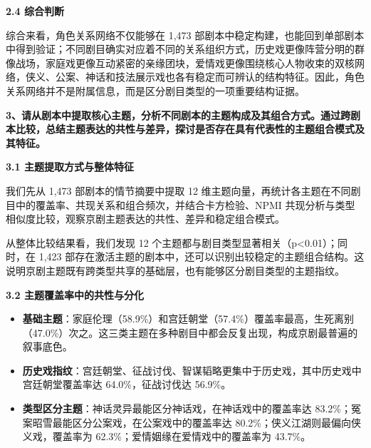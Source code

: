 \documentclass[12pt, a4paper]{article}
\begin{document}
{\fontsize{13bp}{18bp}\heiti\bfseries 2.4 综合判断}

\vspace{4pt}

{\fontsize{12bp}{20bp}\kaishu
综合来看，角色关系网络不仅能够在 1{,}473 部剧本中稳定构建，也能回到单部剧本中得到验证；不同剧目确实对应着不同的关系组织方式，历史戏更像阵营分明的群像战场，家庭戏更像互动紧密的亲缘团块，爱情戏更像围绕核心人物收束的双核网络，侠义、公案、神话和技法展示戏也各有稳定而可辨认的结构特征。因此，角色关系网络并不是附属信息，而是区分剧目类型的一项重要结构证据。
}

\vspace{10pt}

\newpage


{\fontsize{13bp}{20bp}\heiti\bfseries
3、请从剧本中提取核心主题，分析不同剧本的主题构成及其组合方式。通过跨剧本比较，总结主题表达的共性与差异，探讨是否存在具有代表性的主题组合模式及其特征。
}

\vspace{6pt}

{\fontsize{13bp}{18bp}\heiti\bfseries 3.1 主题提取方式与整体特征}

\vspace{4pt}

{\fontsize{12bp}{20bp}\kaishu
我们先从 1{,}473 部剧本的情节摘要中提取 12 维主题向量，再统计各主题在不同剧目中的覆盖率、共现关系和组合频次，并结合卡方检验、NPMI 共现分析与类型相似度比较，观察京剧主题表达的共性、差异和稳定组合模式。
}

{\fontsize{12bp}{20bp}\kaishu
从整体比较结果看，我们发现 12 个主题都与剧目类型显著相关（p<0.01）；同时，在 1{,}423 部存在激活主题的剧本中，还可以识别出较稳定的主题组合结构。这说明京剧主题既有跨类型共享的基础层，也有能够区分剧目类型的主题指纹。
}

\vspace{6pt}

{\fontsize{13bp}{18bp}\heiti\bfseries 3.2 主题覆盖率中的共性与分化}

\vspace{4pt}
{\fontsize{12bp}{20bp}\kaishu
\begin{itemize}[leftmargin=2.2em,itemsep=2pt,topsep=2pt]
\item \textbf{基础主题}：家庭伦理（58.9\%）和宫廷朝堂（57.4\%）覆盖率最高，生死离别（47.0\%）次之。这三类主题在多种剧目中都会反复出现，构成京剧最普遍的叙事底色。
\item \textbf{历史戏指纹}：宫廷朝堂、征战讨伐、智谋韬略更集中于历史戏，其中历史戏中宫廷朝堂覆盖率达 64.0\%，征战讨伐达 56.9\%。
\item \textbf{类型区分主题}：神话灵异最能区分神话戏，在神话戏中的覆盖率达 83.2\%；冤案昭雪最能区分公案戏，在公案戏中的覆盖率达 80.2\%；侠义江湖则最偏向侠义戏，覆盖率为 62.3\%；爱情姻缘在爱情戏中的覆盖率为 43.7\%。
\end{itemize}
}
\end{document}
